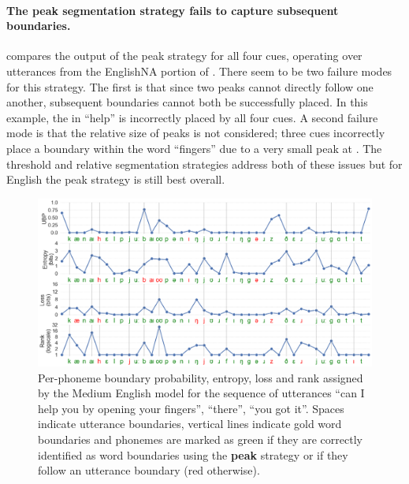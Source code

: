 
\paragraph{The peak segmentation strategy fails to capture subsequent boundaries.}
 compares the output of the peak strategy for all four cues, operating over utterances from the EnglishNA portion of \ipachildes. There seem to be two failure modes for this strategy. The first is that since two peaks cannot directly follow one another, subsequent boundaries cannot both be successfully placed. In this example, the  in ``help'' is incorrectly placed by all four cues. A second failure mode is that the relative size of peaks is not considered; three cues incorrectly place a boundary within the word ``fingers'' due to a very small peak at \ttipa{\textschwa}. The threshold and relative segmentation strategies address both of these issues but for English the peak strategy is still best overall.


\begin{figure}
    \centering
    \includegraphics[width=\linewidth]{Figures/15Phonology/qualitative.png}
    \caption{Per-phoneme boundary probability, entropy, loss and rank assigned by the Medium English model for the sequence of utterances ``can I help you by opening your fingers'', ``there'', ``you got it''. Spaces indicate utterance boundaries, vertical lines indicate gold word boundaries and phonemes are marked as green if they are correctly identified as word boundaries using the \textbf{peak} strategy or if they follow an utterance boundary (red otherwise).}
    \label{fig:15-qualitative}
\end{figure}

